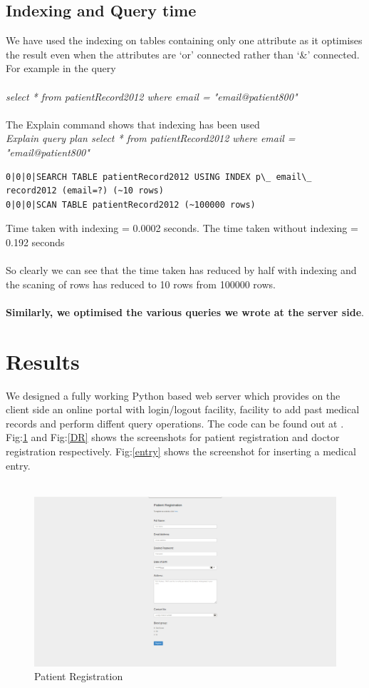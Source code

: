\documentclass{article}
\begin{document}
\subsection{Indexing and Query time}
\vspace{0.1in}
We have used the indexing on tables containing only one attribute as it optimises the result even when the attributes are `or' connected rather than `\&' connected\cite{bib5}. For example in the query\\\\{\it select * from patientRecord2012 where email = "email@patient800"}\\\\
The Explain command shows that indexing has been used\\
{\it Explain query plan select * from patientRecord2012 where email = "email@patient800"}
\begin{lstlisting}
0|0|0|SEARCH TABLE patientRecord2012 USING INDEX p\_ email\_ record2012 (email=?) (~10 rows)
0|0|0|SCAN TABLE patientRecord2012 (~100000 rows)
\end{lstlisting}

Time taken with indexing = 0.0002 seconds. The time taken without indexing = 0.192 seconds\\\\
So clearly we can see that the time taken has reduced by half with indexing and the scaning of rows has reduced to 10 rows from 100000 rows.\\\\{\bf Similarly, we optimised the various queries we wrote at the server side}.

\newpage
\section{Results}

We designed a fully working Python based web server which provides on the client side an online portal with login/logout facility, facility to add past medical records and perform diffent query operations. The code can be found out at \cite{bib7}.
Fig:\ref{PR} and Fig:\ref{DR} shows the screenshots for patient registration and doctor registration respectively. Fig:\ref{entry} shows the screenshot for inserting a medical entry.\\\\

\begin{figure}[!htbp]
	\centering
	\includegraphics[width=0.8\columnwidth]{patient_reg.png}
	\caption{Patient Registration}
	\label{PR}
\end{figure}
\end{document}
